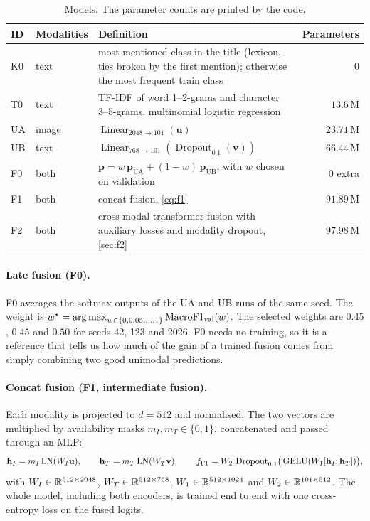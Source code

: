 \begin{table}[H]
  \centering\small
  \caption{Models. The parameter counts are printed by the code.}
  \label{tab:models}
  \begin{tabularx}{\linewidth}{@{}llYr@{}}
    \toprule
    ID & Modalities & Definition & Parameters \\
    \midrule
    K0 & text  & most-mentioned class in the title (lexicon, ties broken by the first mention); otherwise the most frequent train class & 0 \\
    T0 & text  & TF-IDF of word 1--2-grams and character 3--5-grams, multinomial logistic regression~\cite{pedregosa2011sklearn} & $13.6$\,M \\
    UA & image & $\operatorname{Linear}_{2048\to101}(\mathbf{u})$ & $23.71$\,M \\
    UB & text  & $\operatorname{Linear}_{768\to101}(\operatorname{Dropout}_{0.1}(\mathbf{v}))$ & $66.44$\,M \\
    F0 & both  & $\mathbf{p} = w\,\mathbf{p}_{\mathrm{UA}} + (1-w)\,\mathbf{p}_{\mathrm{UB}}$, with $w$ chosen on validation & $0$ extra \\
    F1 & both  & concat fusion, \cref{eq:f1} & $91.89$\,M \\
    F2 & both  & cross-modal transformer fusion with auxiliary losses and modality dropout, \cref{sec:f2} & $97.98$\,M \\
    \bottomrule
  \end{tabularx}
\end{table}

\paragraph{Late fusion (F0).}
F0 averages the softmax outputs of the UA and UB runs of the same seed. The weight is
$w^\star = \operatorname*{arg\,max}_{w \in \{0, 0.05, \dots, 1\}} \mathrm{MacroF1}_{\mathrm{val}}(w)$. The selected weights are
$0.45$, $0.45$ and $0.50$ for seeds 42, 123 and 2026. F0 needs no training, so it is a reference that tells us how
much of the gain of a trained fusion comes from simply combining two good unimodal predictions.

\paragraph{Concat fusion (F1, intermediate fusion).}
Each modality is projected to $d=512$ and normalised. The two vectors are multiplied by availability masks
$m_I, m_T \in \{0,1\}$, concatenated and passed through an MLP:
\begin{equation}
  \label{eq:f1}
  \mathbf{h}_I = m_I \operatorname{LN}(W_I\mathbf{u}), \qquad
  \mathbf{h}_T = m_T \operatorname{LN}(W_T\mathbf{v}), \qquad
  f_{\mathrm{F1}} = W_2\,\operatorname{Dropout}_{0.1}\!\big(\operatorname{GELU}(W_1[\mathbf{h}_I;\mathbf{h}_T])\big),
\end{equation}
with $W_I \in \mathbb{R}^{512\times2048}$, $W_T \in \mathbb{R}^{512\times768}$, $W_1 \in \mathbb{R}^{512\times1024}$ and
$W_2 \in \mathbb{R}^{101\times512}$. The whole model, including both encoders, is trained end to end with one
cross-entropy loss on the fused logits.

